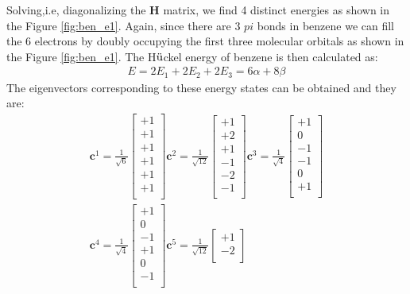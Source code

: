 \documentclass[9pt,twocolumn,twoside]{optica}
\begin{document}
Solving,i.e, diagonalizing the \textbf{H} matrix, we find 4 distinct energies as shown in the Figure \ref{fig:ben_e1}. Again, since there are 3 $pi$ bonds in benzene we can fill the  6 electrons by doubly occupying the first three molecular orbitals as shown in the Figure \ref{fig:ben_e1}. The H$\ddot{\text u}$ckel energy of benzene is then calculated as:
\begin{align}
E=2E_1+2E_2+2E_3= 6\alpha+8\beta
 \label{eq:ee}
\end{align}
The eigenvectors corresponding to these energy states can be obtained and they are:
\begin{align}
\textbf{c}^1=\frac{1}{\sqrt{6}}
\begin{bmatrix}
    +1\\
    +1\\
    +1\\
    +1\\
    +1\\
    +1\\   
\end{bmatrix}
\textbf{c}^2=\frac{1}{\sqrt{12}}
\begin{bmatrix}
    +1\\
    +2\\
    +1\\
    -1\\
    -2\\
    -1\\   
\end{bmatrix}
\textbf{c}^3=\frac{1}{\sqrt{4}}
\begin{bmatrix}
    +1\\
    0\\
    -1\\
    -1\\
    0\\
    +1\\   
\end{bmatrix}\\
\textbf{c}^4=\frac{1}{\sqrt{4}}
\begin{bmatrix}
    +1\\
    0\\
    -1\\
    +1\\
    0\\
    -1\\   
\end{bmatrix}
\textbf{c}^5=\frac{1}{\sqrt{12}}
\begin{bmatrix}
    +1\\
    -2\\

\end{bmatrix}
\end{align}
\end{document}
